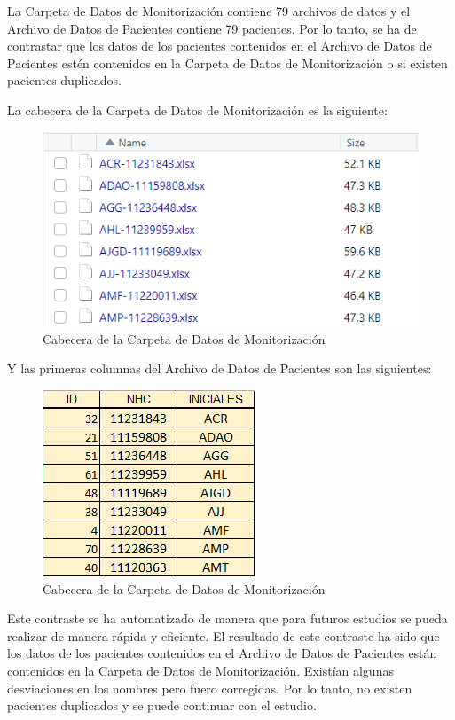 La Carpeta de Datos de Monitorización contiene 79 archivos de datos y el Archivo de Datos de Pacientes contiene 79 pacientes. Por lo tanto, se ha de contrastar que los datos de los pacientes contenidos en el Archivo de Datos de Pacientes estén contenidos en la Carpeta de Datos de Monitorización o si existen pacientes duplicados.

La cabecera de la Carpeta de Datos de Monitorización es la siguiente:
\begin{figure}[H]
    \centering
    \includegraphics[scale=0.70]{./img/Carpeta-Monitor.png}
    \caption{Cabecera de la Carpeta de Datos de Monitorización}
    \label{fig:cabecera_monitorizacion}
\end{figure}

Y las primeras columnas del Archivo de Datos de Pacientes son las siguientes:
\begin{figure}[H]
    \centering
    \includegraphics[scale=1.0]{./img/Archivo-Monitor.png}
    \caption{Cabecera de la Carpeta de Datos de Monitorización}
    \label{fig:cabecera_monitorizacion}
\end{figure}

Este contraste se ha automatizado de manera que para futuros estudios se pueda realizar de manera rápida y eficiente. El resultado de este contraste ha sido que los datos de los pacientes contenidos en el Archivo de Datos de Pacientes están contenidos en la Carpeta de Datos de Monitorización. Existían algunas desviaciones en los nombres pero fuero corregidas. Por lo tanto, no existen pacientes duplicados y se puede continuar con el estudio.


